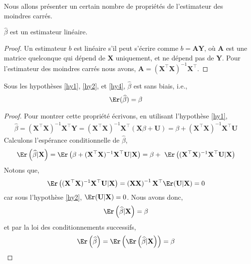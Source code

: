Nous allons présenter un certain nombre de propriétés de l'estimateur des moindres carrés.
\begin{proposition}$\widehat{\beta}$ est un estimateur linéaire.
\end{proposition}
\begin{proof}
Un estimateur $b$ est linéaire s'il peut s'écrire comme $b=\mathbf{A}\mathbf{Y}$, où $\mathbf{A}$ est une matrice quelconque qui dépend de $\mathbf{X}$ uniquement, et ne dépend pas de $\mathbf{Y}$. Pour l'estimateur des moindres carrés nous avons, $\mathbf{A} = (\mathbf{X}^\top\mathbf{X})^{-1}\mathbf{X}^\top$.
\end{proof}
\begin{proposition}
Sous les hypothèses \ref{hy1}, \ref{hy2}, et \ref{hy4}, $\widehat{\beta}$ est sans biais, i.e.,
\begin{align*}
\Er(\widehat{\beta}) = \beta
\end{align*}
\end{proposition}
\begin{proof}
Pour montrer cette propriété écrivons, en utilisant l'hypothèse \ref{hy1},
\begin{align*}
\widehat{\beta} = (\mathbf{X}^\top\mathbf{X})^{-1}\mathbf{X}^\top\mathbf{Y} =  (\mathbf{X}^\top\mathbf{X})^{-1}\mathbf{X}^\top (\mathbf{X}\beta + \mathbf{U}) = 
\beta + (\mathbf{X}^\top\mathbf{X})^{-1}\mathbf{X}^\top\mathbf{U}
\end{align*}
Calculons l'espérance conditionnelle de $\widehat{\beta}$,
\begin{align*}
\Er\left(\widehat{\beta} | \mathbf{X}\right) = \Er\left(\beta + (\mathbf{X}^\top\mathbf{X})^{-1}\mathbf{X}^\top\mathbf{U} | \mathbf{X}\right) = \beta +\ \Er\left((\mathbf{X}^\top\mathbf{X})^{-1}\mathbf{X}^\top\mathbf{U} | \mathbf{X}\right)
\end{align*}
Notons que,
\begin{align*}
\Er\left((\mathbf{X}^\top\mathbf{X})^{-1}\mathbf{X}^\top\mathbf{U} | \mathbf{X}\right) = 
\left(\mathbf{X}\mathbf{X}\right)^{-1}\mathbf{X}^\top\Er(\mathbf{U}|\mathbf{X}) = 0
\end{align*} 
car sous l'hypothèse \ref{hy2}, $\Er(\mathbf{U}|\mathbf{X}) = 0$. Nous avons donc,
\begin{align}
\Er\left(\widehat{\beta} | \mathbf{X}\right) = \beta
\label{eq13}
\end{align}
et par la loi des conditionnements successifs,
\begin{align*}
\Er\left(\widehat{\beta}\right) = \Er\left(\Er\left(\widehat{\beta} | \mathbf{X}\right)\right)=\beta
\end{align*}
\end{proof}
